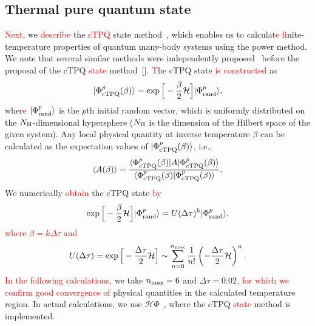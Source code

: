 \documentclass[twocolumn,superscriptaddress,showpacs, longbibliography, aps, prb]{revtex4-2}
\newcommand{\red}[1]{\textcolor{red}{#1}}
\begin{document}
\subsection{Thermal pure quantum state}\label{subsec:Thermal pure quantum state}
\red{Next}, we %
\red{describe} the %
\red{cTPQ} %
state method~\cite{Sugiura_PRL2013}, 
which enables us to calculat\red{e %
f}inite\red{-}temperature properties of quantum many-body systems using the power method. We note that several similar methods were independently proposed~\cite{Imada_JPSJ1986,Jaklic_PRB1994,Hams_PRE2000,Lloyd} before the proposal of the cTPQ \red{state} method~[].
\red{T}he 
cTPQ state %
\red{is constructed} a\red{s} %
\begin{align}
|\Phi_{\rm cTPQ}^{p}(\beta)\rangle = \exp\Big[-\frac{\beta}{2}\mathcal{H}\Big]|\Phi_{\rm rand}^{p}\rangle,
\end{align}
wher\red{e} %
$|\Phi_{\rm rand}^{p}\rangle$ is the $p$th initial random vector, which is uniformly distributed
on the $N_{\rm H}$\red{-}dimensional hypersphere ($N_{\rm H}$ is the dimension of the Hilbert space of the given system).
Any local physical quantity at inverse temperature $\beta$
can be calculated as the expectation values of $|\Phi_{\rm cTPQ}^{p}(\beta)\rangle$, i.e.,
\begin{align}
\langle A(\beta)\rangle
=\frac{\langle \Phi_{\rm cTPQ}^{p}(\beta)|A|\Phi_{\rm cTPQ}^{p}(\beta)\rangle}
{\langle \Phi_{\rm cTPQ}^{p}(\beta)|\Phi_{\rm cTPQ}^{p}(\beta)\rangle}.
\end{align}
We numerically %
\red{obtain} the cTPQ state %
\red{by} 
\begin{align}
\exp\Big[-\frac{\beta}{2}\mathcal{H}\Big]|\Phi_{\rm rand}^{p}\rangle=U(\Delta\tau)^{k}|\Phi_{\rm rand}^{p}\rangle,%
\end{align}
\red{where $\beta=k\Delta\tau$ and}
\begin{align}
U(\Delta\tau)=\exp\Big[-\frac{\Delta\tau}{2}\mathcal{H}\Big]\sim\sum_{n=0}^{n_{\rm max}}\frac{1}{n!}\left(-\frac{\Delta\tau}{2}\mathcal{H}\right)^{n}\red{.} %
\end{align}
\red{In the following calculations,} we take $n_{\rm max}=6$ and $\Delta\tau =0.02$\red{, %
for which we confirm good convergence of} 
physical quantities
in the calculated temperature region.
In actual calculations, we use $\mathcal{H}\Phi$~\cite{Kawamura_CPC2017,HPhi_v2,HPhi_release}, 
where the cTPQ \red{state} method is implemented.
\end{document}
